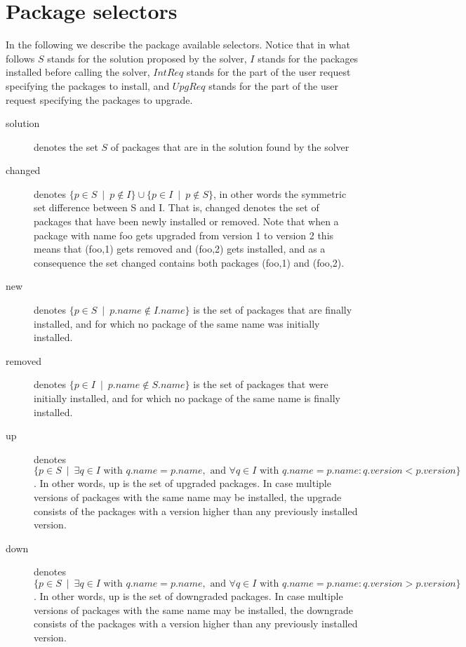 \documentclass{article}
\begin{document}
\section{Package selectors}

In the following we describe the package available selectors. Notice that in what follows
$S$ stands for the solution proposed by the solver, $I$ stands for the packages installed
before calling the solver, $IntReq$ stands for the part of the user request specifying
the packages to install, and $UpgReq$ stands for the part of the user request specifying
the packages to upgrade.

\begin{description}
  \item[solution] denotes the set $S$ of packages that are in the solution found by the solver
  \item[changed] denotes $\{p \in S ~\mid~  p \not\in I\} \cup \{p \in I ~\mid~  p
    \not\in S\}$, in other words the symmetric set difference between S and
    I. That is, changed denotes the set of packages that have been newly
    installed or removed. Note that when a package with name foo gets upgraded
    from version 1 to version 2 this means that (foo,1) gets removed and
    (foo,2) gets installed, and as a consequence the set changed contains both
    packages (foo,1) and (foo,2).
  \item[new] denotes $\{ p \in S ~\mid~  p.name \not\in I.name \}$ is the set of
    packages that are finally installed, and for which no package of the same
    name was initially installed.
  \item[removed] denotes $\{ p \in I ~\mid~  p.name \not\in S.name \}$ is the set of
    packages that were initially installed, and for which no package of the
    same name is finally installed.
  \item[up] denotes $\{ p \in S ~\mid~  \exists q \in I \mbox{ with } q.name = p.name, \mbox{ and } \forall q \in I
    \mbox{ with } q.name = p.name : q.version < p.version\}$. 
    In other words, up is the set of upgraded packages. In case multiple
    versions of packages with the same name may be installed, the upgrade
    consists of the packages with a version higher than any previously
    installed version.
  \item[down] denotes $\{ p \in S ~\mid~  \exists q \in I \mbox{ with } q.name = p.name, \mbox{ and } \forall q \in I
    \mbox{ with } q.name = p.name : q.version > p.version\}$. 
    In other words, up is the set of downgraded packages. In case multiple
    versions of packages with the same name may be installed, the downgrade
    consists of the packages with a version higher than any previously
    installed version.
\end{description}
\end{document}
